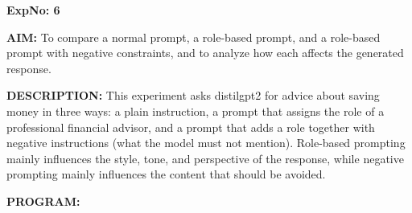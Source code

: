 \documentclass[10pt,a4paper]{article}
\newcommand{\code}[1]{{\ttfamily\hyphenchar\font=-1 #1}}
\newcommand{\sectionlabel}[1]{\par\vspace{3pt}\noindent\textbf{#1}\par\nopagebreak}
\begin{document}
\clearpage

\noindent\textbf{ExpNo: 6}

\noindent\textbf{AIM:} To compare a normal prompt, a role-based prompt, and a role-based prompt with negative constraints, and to analyze how each affects the generated response.

\noindent\textbf{DESCRIPTION:} This experiment asks \code{distilgpt2} for advice about saving money in three ways: a plain instruction, a prompt that assigns the role of a professional financial advisor, and a prompt that adds a role together with negative instructions (what the model must not mention). Role-based prompting mainly influences the style, tone, and perspective of the response, while negative prompting mainly influences the content that should be avoided.

\sectionlabel{PROGRAM:}
\end{document}
